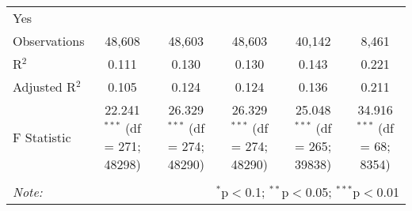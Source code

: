 \begin{table}[!htbp]
\begin{tabular}{@{\extracolsep{5pt}}lccccc}
Yes &  &  &  &  &  \\ 
Observations & 48,608 & 48,603 & 48,603 & 40,142 & 8,461 \\ 
R$^{2}$ & 0.111 & 0.130 & 0.130 & 0.143 & 0.221 \\ 
Adjusted R$^{2}$ & 0.105 & 0.124 & 0.124 & 0.136 & 0.211 \\ 
F Statistic & 22.241$^{***}$ (df = 271; 48298) & 26.329$^{***}$ (df = 274; 48290) & 26.329$^{***}$ (df = 274; 48290) & 25.048$^{***}$ (df = 265; 39838) & 34.916$^{***}$ (df = 68; 8354) \\ 
\hline 
\hline \\[-1.8ex] 
\textit{Note:}  & \multicolumn{5}{r}{$^{*}$p$<$0.1; $^{**}$p$<$0.05; $^{***}$p$<$0.01} \\ 
\end{tabular} 
\end{table} 
